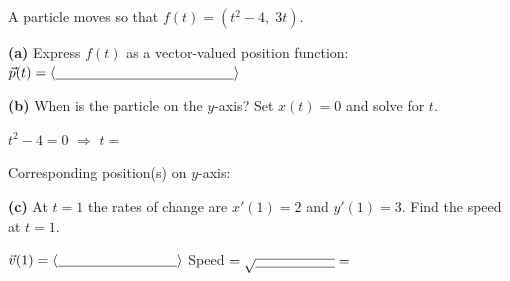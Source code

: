 \documentclass[10pt]{article}
\begin{document}
\vspace{0.1in}

\begin{tcolorbox}[colback=white, colframe=black!40,
    title=\textbf{Tier A --- Apply},
    fonttitle=\bfseries, arc=2mm, left=3mm, right=3mm, top=2mm, bottom=2mm]
\small

A particle moves so that $f(t)=(t^{2}-4,\;3t)$.

\vspace{0.06in}
\textbf{(a)} Express $f(t)$ as a vector-valued position function:
$\vec{p}(t) = \langle \blank{4.5cm}\rangle$

\vspace{0.1in}
\textbf{(b)} When is the particle on the $y$-axis?  Set $x(t)=0$ and solve for $t$.

\vspace{0.06in}
\hspace{1em} $t^{2}-4=0$ $\Rightarrow$ $t=$ \blank{2.5cm}

\hspace{1em} Corresponding position(s) on $y$-axis: \blank{4cm}

\vspace{0.1in}
\textbf{(c)} At $t=1$ the rates of change are $x'(1)=2$ and $y'(1)=3$.
Find the speed at $t=1$.

\vspace{0.06in}
\hspace{1em} $\vec{v}(1) = \langle \blank{3cm}\rangle$ \qquad
Speed $= \sqrt{\blank{2cm}} = $ \blank{3cm}

\end{tcolorbox}

\vspace{0.1in}
\end{document}

